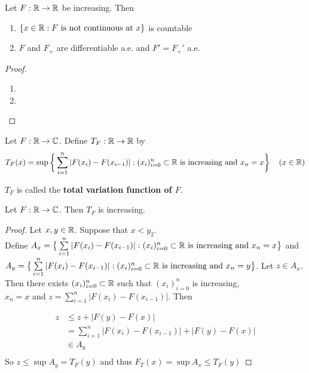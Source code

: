 \documentclass{book}
\begin{document}
	\begin{ex}
		Let $F:\mathbb{R} \rightarrow \mathbb{R}$ be increasing. Then 
		\begin{enumerate}
			\item $\{x \in \mathbb{R}: F \text{ is not continuous at }x\}$ is countable
			\item $F$ and $F_+$ are differentiable a.e. and $F' = F_+'$ a.e.
		\end{enumerate}
	\end{ex}

	\begin{proof}\
		\begin{enumerate}
			\item 
			\item 
		\end{enumerate}
	\end{proof}
	
	\begin{defn}  
		Let $F:\mathbb{R} \rightarrow \mathbb{C}$. Define $T_F:\mathbb{R} \rightarrow \mathbb{R}$ by $$T_F(x) = \sup\bigg \{\sum\limits_{i=1}^{n}|F(x_{i}) - F(x_{i-1})|: (x_i)_{i=0}^n \subset \mathbb{R} \text{ is increasing and } x_n=x  \bigg \} \hspace{4mm} (x \in \mathbb{R})$$
		
		$T_F$ is called the \textbf{total variation function of $F$}.
	\end{defn}
	
	\begin{ex}  
		Let $F:\mathbb{R} \rightarrow \mathbb{C}$. Then $T_F$ is increasing.
	\end{ex}
	
	\begin{proof}
		Let $x,y \in \mathbb{R}$. Suppose that $x<y_2$. \\Define  $A_x = \big \{\sum\limits_{i=1}^{n}|F(x_{i}) - F(x_{i-1})|: (x_i)_{i=0}^n \subset \mathbb{R} \text{ is increasing and } x_n=x  \big \}$ and \\$A_y = \big \{\sum\limits_{i=1}^{n}|F(x_{i}) - F(x_{i-1})|: (x_i)_{i=0}^n \subset \mathbb{R} \text{ is increasing and } x_n=y  \big \}$. Let $z \in A_x$. Then there exists $(x_i)_{i=0}^n \subset \mathbb{R}$ such that $(x_i)_{i=0}^n$ is increasing,\\ $x_n=x$ and $z = \sum\limits_{i=1}^n |F(x_{i}) - F(x_{i-1})|$. Then
		
		\begin{align*}
			z 
			& \leq z+|F(y)-F(x)|\\
			&= \sum\limits_{i=1}^n |F(x_{i}) - F(x_{i-1})| + |F(y)-F(x)|\\
			& \in A_y\\
		\end{align*} 
		So $z \leq \sup A_y = T_F(y) $ and thus $F_T(x)  = \sup A_x \leq T_F(y)$
	\end{proof}
	
\end{document}
